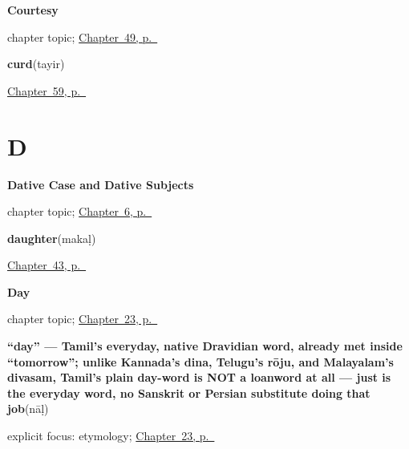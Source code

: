 \noindent\begin{minipage}[t]{\linewidth}
\raggedright
\textbf{Courtesy}\par
\footnotesize chapter topic; \hyperref[ch:ta-courtesy]{Chapter~49, p.~\pageref*{ch:ta-courtesy}}
\end{minipage}\par\smallskip

\noindent\begin{minipage}[t]{\linewidth}
\raggedright
\textbf{curd}\enspace\emph{}\enspace(tayir)\par
\footnotesize \hyperref[ch:ta-in-the-kitchen]{Chapter~59, p.~\pageref*{ch:ta-in-the-kitchen}}
\end{minipage}\par\smallskip

\section*{D}

\noindent\begin{minipage}[t]{\linewidth}
\raggedright
\textbf{Dative Case and Dative Subjects}\par
\footnotesize chapter topic; \hyperref[ch:ta-dative-case]{Chapter~6, p.~\pageref*{ch:ta-dative-case}}
\end{minipage}\par\smallskip

\noindent\begin{minipage}[t]{\linewidth}
\raggedright
\textbf{daughter}\enspace\emph{}\enspace(makaḷ)\par
\footnotesize \hyperref[ch:ta-household]{Chapter~43, p.~\pageref*{ch:ta-household}}
\end{minipage}\par\smallskip

\noindent\begin{minipage}[t]{\linewidth}
\raggedright
\textbf{Day}\par
\footnotesize chapter topic; \hyperref[ch:ta-day]{Chapter~23, p.~\pageref*{ch:ta-day}}
\end{minipage}\par\smallskip

\noindent\begin{minipage}[t]{\linewidth}
\raggedright
\textbf{\textquotedblleft{}day\textquotedblright{} — Tamil's everyday, native Dravidian word, already met inside \textquotedblleft{}tomorrow\textquotedblright{}; unlike Kannada's dina, Telugu's rōju, and Malayalam's divasam, Tamil's plain day-word is NOT a loanword at all —  just is the everyday word, no Sanskrit or Persian substitute doing that job}\enspace\emph{}\enspace(nāḷ)\par
\footnotesize explicit focus: etymology; \hyperref[ch:ta-day]{Chapter~23, p.~\pageref*{ch:ta-day}}
\end{minipage}\par\smallskip

